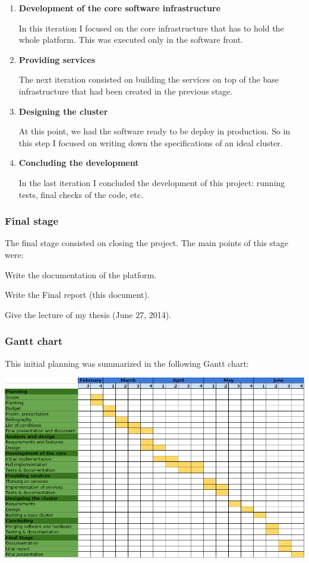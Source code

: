 \begin{enumerate}
\item {\bf Development of the core software infrastructure}

In this iteration I focused on the core infrastructure that has to
hold the whole platform. This was executed only in the software front.

\item {\bf Providing services}

The next iteration consisted on building the services on top of the base
infrastructure that had been created in the previous stage.

\item {\bf Designing the cluster}

At this point, we had the software ready to be deploy in production. So in this
step I focused on writing down the specifications of an ideal cluster.

\item {\bf Concluding the development}

In the last iteration I concluded the development of this project: running
tests, final checks of the code, etc.
\end{enumerate}


\subsubsection*{Final stage}

The final stage consisted on closing the project. The main points of this stage
were:

\mylist
  \item Write the documentation of the platform.
  \item Write the Final report (this document).
  \item Give the lecture of my thesis (June 27, 2014).
\mylistend

\subsubsection*{Gantt chart}

This initial planning was summarized in the following Gantt chart:

\begin{center}
  \hspace*{-2cm}
  \includegraphics[scale=0.75]{development/images/gantt.png}
\end{center}

